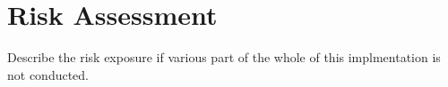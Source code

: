 \section{Risk Assessment}

Describe the risk exposure if various part of the whole of this implmentation is not conducted.